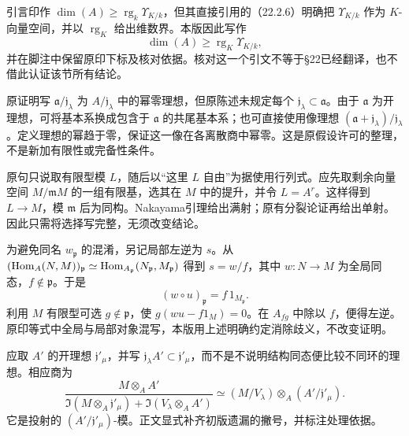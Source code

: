 引言印作 $\dim(A)\ge\operatorname{rg}_k\Upsilon_{K/k}$，但其直接引用的（22.2.6）明确把 $\Upsilon_{K/k}$ 作为 $K$-向量空间，并以 $\operatorname{rg}_K$ 给出维数界。本版因此写作
\[
 \dim(A)\ge\operatorname{rg}_K\Upsilon_{K/k},
\]
并在脚注中保留原印下标及核对依据。核对这一个引文不等于§22已经翻译，也不借此认证该节所有结论。

原证明写 $\mathfrak a/\mathfrak j_\lambda$ 为 $A/\mathfrak j_\lambda$ 中的幂零理想，但原陈述未规定每个 $\mathfrak j_\lambda\subset\mathfrak a$。由于 $\mathfrak a$ 为开理想，可将基本系换成包含于 $\mathfrak a$ 的共尾基本系；也可直接使用像理想 $(\mathfrak a+\mathfrak j_\lambda)/\mathfrak j_\lambda$。定义理想的幂趋于零，保证这一像在各离散商中幂零。这是原假设许可的整理，不是新加有限性或完备性条件。

原句只说取有限型模 $L$，随后以“这里 $L$ 自由”为据使用行列式。应先取剩余向量空间 $M/\mathfrak mM$ 的一组有限基，选其在 $M$ 中的提升，并令 $L=A^r$。这样得到 $L\to M$，模 $\mathfrak m$ 后为同构。Nakayama引理给出满射；原有分裂论证再给出单射。因此只需将选择写完整，无须改变结论。

为避免同名 $w_{\mathfrak p}$ 的混淆，另记局部左逆为 $s$。从
$(\operatorname{Hom}_A(N,M))_{\mathfrak p}\simeq\operatorname{Hom}_{A_{\mathfrak p}}(N_{\mathfrak p},M_{\mathfrak p})$
得到 $s=w/f$，其中 $w:N\to M$ 为全局同态，$f\notin\mathfrak p$。于是
\[
 (w\circ u)_{\mathfrak p}=f\,1_{M_{\mathfrak p}}.
\]
利用 $M$ 有限型可选 $g\notin\mathfrak p$，使 $g(wu-f1_M)=0$。在 $A_{fg}$ 中除以 $f$，便得左逆。原印等式中全局与局部对象混写，本版用上述明确约定消除歧义，不改变证明。

应取 $A'$ 的开理想 $\mathfrak j'_\mu$，并写
$\mathfrak j_\lambda A'\subset\mathfrak j'_\mu$，而不是不说明结构同态便比较不同环的理想。相应商为
\[
 \frac{M\otimes_AA'}{\Im(M\otimes_A\mathfrak j'_\mu)+\Im(V_\lambda\otimes_AA')}
 \simeq (M/V_\lambda)\otimes_A(A'/\mathfrak j'_\mu).
\]
它是投射的 $(A'/\mathfrak j'_\mu)$-模。正文显式补齐初版遗漏的撇号，并标注处理依据。

